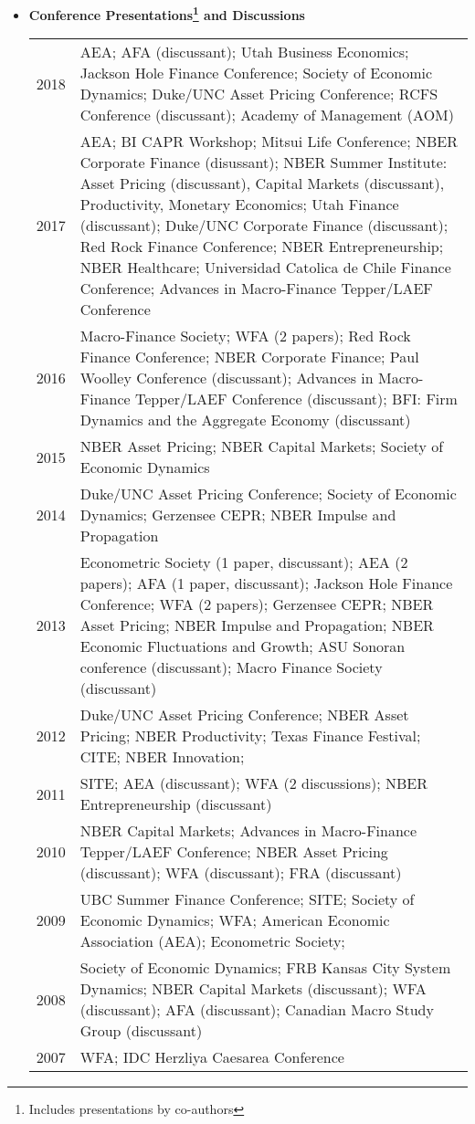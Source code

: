 \documentclass[12pt,letterpaper,serif,overlapped]{res}
\begin{document}
\begin{resume}
\begin{itemize}
\item \textbf{Conference Presentations\footnote[1]{Includes presentations by co-authors} and Discussions}
\begin{longtable}{lp{15cm}}
2018 &  AEA; AFA (discussant); Utah Business Economics; Jackson Hole Finance Conference; Society of Economic Dynamics; Duke/UNC Asset Pricing Conference; RCFS Conference (discussant); Academy of Management (AOM)\\[0.1cm]
2017 & AEA; BI CAPR Workshop; Mitsui Life Conference; NBER Corporate Finance (disussant); NBER Summer Institute:  Asset Pricing (discussant), Capital Markets (discussant),  Productivity, Monetary Economics; Utah Finance (discussant); Duke/UNC Corporate Finance (discussant); Red Rock Finance Conference;  NBER Entrepreneurship; NBER Healthcare; Universidad Catolica de Chile Finance Conference; Advances in Macro-Finance Tepper/LAEF Conference \\[0.1cm]
2016 & Macro-Finance Society; WFA (2 papers); Red Rock Finance Conference; NBER Corporate Finance; Paul Woolley Conference (discussant); Advances in Macro-Finance Tepper/LAEF Conference (discussant); BFI: Firm Dynamics and the Aggregate Economy (discussant)\\[0.1cm]
2015 & NBER Asset Pricing;  NBER Capital Markets; Society of Economic Dynamics\\[0.1cm]
2014 & Duke/UNC Asset Pricing Conference; Society of Economic Dynamics; Gerzensee CEPR; NBER Impulse and Propagation\\[0.1cm]
2013 & Econometric Society (1 paper, discussant); AEA (2 papers); AFA (1 paper, discussant); Jackson Hole Finance Conference; WFA (2 papers); Gerzensee CEPR; NBER Asset Pricing; NBER Impulse and Propagation;  NBER Economic Fluctuations and Growth; ASU Sonoran conference (discussant); Macro Finance Society (discussant) \\[0.1cm]
2012 & Duke/UNC Asset Pricing Conference; NBER Asset Pricing; NBER Productivity; Texas Finance Festival; CITE; NBER Innovation;\\[0.1cm]
2011 & SITE; AEA (discussant); WFA (2 discussions); NBER Entrepreneurship (discussant) \\[0.1cm]
2010 & NBER Capital Markets; Advances in Macro-Finance Tepper/LAEF Conference; NBER Asset Pricing (discussant); WFA (discussant); FRA (discussant)  \\[0.1cm]
2009 & UBC Summer Finance Conference; SITE;   Society of Economic Dynamics; WFA; American Economic Association (AEA); Econometric Society;\\[0.1cm]
2008 & Society of Economic Dynamics;   FRB Kansas City System Dynamics; NBER Capital Markets (discussant); WFA (discussant); AFA (discussant); Canadian Macro Study Group (discussant)\\[0.1cm]
2007 & WFA; IDC Herzliya Caesarea Conference\\[0.1cm]
\end{longtable}
\vspace{0.5cm}



\end{itemize}
\end{resume}
\end{document}
